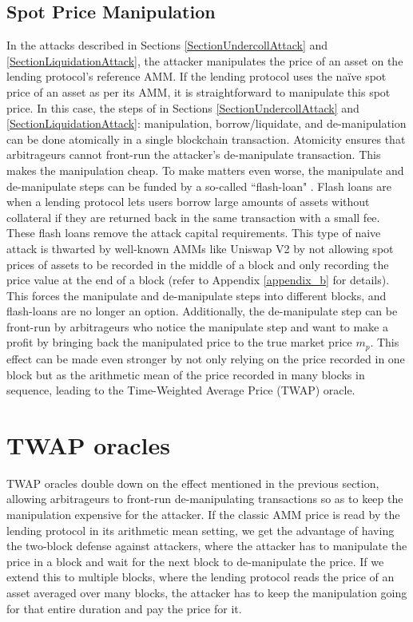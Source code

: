 \subsection{Spot Price Manipulation}
In the attacks described in Sections \ref{SectionUndercollAttack} and \ref{SectionLiquidationAttack}, the attacker manipulates the price of an asset on the lending protocol's reference AMM. If the lending protocol uses the na\"ive spot price of an asset as per its AMM, it is straightforward to manipulate this spot price. In this case, the steps of in Sections \ref{SectionUndercollAttack} and \ref{SectionLiquidationAttack}: manipulation, borrow/liquidate, and de-manipulation can be done atomically in a single blockchain transaction. Atomicity ensures that arbitrageurs cannot front-run the attacker's de-manipulate transaction. This makes the manipulation cheap. To make matters even worse, the manipulate and de-manipulate steps can be funded by a so-called ``flash-loan" \cite{qin2021attacking}. Flash loans are when a lending protocol lets users borrow large amounts of assets without collateral if they are returned back in the same transaction with a small fee. These flash loans remove the attack capital requirements. This type of naive attack is thwarted by well-known AMMs like Uniswap V2 \cite{Adams2020UniV2} by not allowing spot prices of assets to be recorded in the middle of a block and only recording the price value at the end of a block (refer to Appendix \ref{appendix_b} for details). This forces the manipulate and de-manipulate steps into different blocks, and flash-loans are no longer an option. Additionally, the de-manipulate step can be front-run by arbitrageurs who notice the manipulate step and want to make a profit by bringing back the manipulated price to the true market price $m_p$. This effect can be made even stronger by not only relying on the price recorded in one block but as the arithmetic mean of the price recorded in many blocks in sequence, leading to the Time-Weighted Average Price (TWAP) oracle.

\section{TWAP oracles}
TWAP oracles double down on the effect mentioned in the previous section, allowing arbitrageurs to front-run de-manipulating transactions so as to keep the manipulation expensive for the attacker. If the classic AMM price is read by the lending protocol in its arithmetic mean setting, we get the advantage of having the two-block defense against attackers, where the attacker has to manipulate the price in a block and wait for the next block to de-manipulate the price. If we extend this to multiple blocks, where the lending protocol reads the price of an asset averaged over many blocks, the attacker has to keep the manipulation going for that entire duration and pay the price for it.

